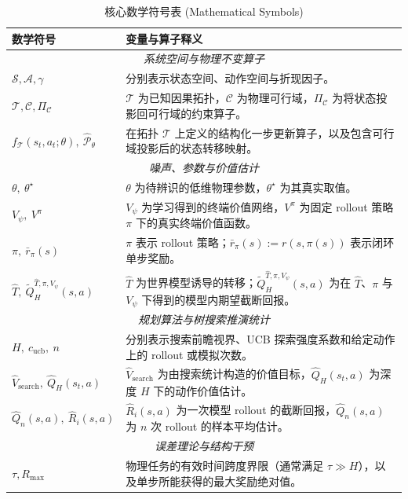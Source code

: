 \documentclass[UTF8]{ctexart}
\begin{document}
\begin{table}[ht]
\centering
\caption{核心数学符号表 (Mathematical Symbols)}
\renewcommand{\arraystretch}{1.08}
\begin{tabular}{p{} p{}}
\toprule
\textbf{数学符号} & \textbf{变量与算子释义} \\
\midrule
\multicolumn{2}{c}{\textit{系统空间与物理不变算子}} \\
\midrule
$\mathcal{S}, \mathcal{A}, \gamma$ & 分别表示状态空间、动作空间与折现因子。 \\
$\mathcal{T}, \mathcal{C}, \Pi_{\mathcal{C}}$ & \(\mathcal{T}\) 为已知因果拓扑，\(\mathcal{C}\) 为物理可行域，\(\Pi_{\mathcal{C}}\) 为将状态投影回可行域的约束算子。 \\
$f_{\mathcal{T}}(s_t, a_t; \theta),\ \hat{\mathcal P}_\theta$ & 在拓扑 \(\mathcal{T}\) 上定义的结构化一步更新算子，以及包含可行域投影后的状态转移映射。 \\
\midrule
\multicolumn{2}{c}{\textit{噪声、参数与价值估计}} \\
\midrule
$\theta,\ \theta^\star$ & \(\theta\) 为待辨识的低维物理参数，\(\theta^\star\) 为其真实取值。 \\
$V_\psi,\ V^\pi$ & \(V_\psi\) 为学习得到的终端价值网络，\(V^\pi\) 为固定 rollout 策略 \(\pi\) 下的真实终端价值函数。 \\
$\pi,\ \bar r_\pi(s)$ & \(\pi\) 表示 rollout 策略；\(\bar r_\pi(s):=r(s,\pi(s))\) 表示闭环单步奖励。 \\
$\hat T,\ \tilde Q_H^{\hat T,\pi,V_\psi}(s,a)$ & \(\hat T\) 为世界模型诱导的转移；\(\tilde Q_H^{\hat T,\pi,V_\psi}(s,a)\) 为在 \(\hat T\)、\(\pi\) 与 \(V_\psi\) 下得到的模型内期望截断回报。 \\
\midrule
\multicolumn{2}{c}{\textit{规划算法与树搜索推演统计}} \\
\midrule
$H,\ c_{\text{ucb}},\ n$ & 分别表示搜索前瞻视界、UCB 探索强度系数和给定动作上的 rollout 或模拟次数。 \\
$\hat{V}_{\text{search}},\ \hat{Q}_H(s_t,a)$ & \(\hat{V}_{\text{search}}\) 为由搜索统计构造的价值目标，\(\hat{Q}_H(s_t,a)\) 为深度 \(H\) 下的动作价值估计。 \\
$\hat{Q}_n(s,a),\ \hat R_i(s,a)$ & \(\hat R_i(s,a)\) 为一次模型 rollout 的截断回报，\(\hat Q_n(s,a)\) 为 \(n\) 次 rollout 的样本平均估计。 \\
\midrule
\multicolumn{2}{c}{\textit{误差理论与结构干预}} \\
\midrule
$\tau, R_{\max}$ & 物理任务的有效时间跨度界限（通常满足 $\tau \gg H$），以及单步所能获得的最大奖励绝对值。 \\

\end{tabular}
\end{table}
\end{document}
